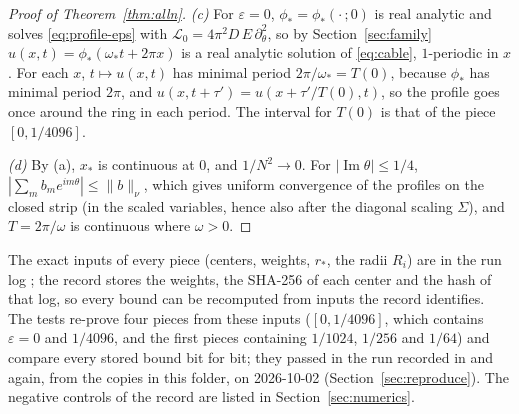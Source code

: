 \documentclass[11pt]{article}
\theoremstyle{definition}
\newcommand{\im}{\operatorname{Im}}
\begin{document}
\begin{proof}[Proof of Theorem~\ref{thm:alln}]
\emph{(c)} For $\varepsilon = 0$, $\phi_* = \phi_*(\cdot\,;0)$ is real analytic and solves \eqref{eq:profile-eps} with $\mathcal L_0 = 4\pi^2D\,E\,\partial_\theta^2$, so by Section~\ref{sec:family} $u(x, t) = \phi_*(\omega_*t + 2\pi x)$ is a real analytic solution of \eqref{eq:cable}, $1$-periodic in $x$. For each $x$, $t \mapsto u(x, t)$ has minimal period $2\pi/\omega_* = T(0)$, because $\phi_*$ has minimal period $2\pi$, and $u(x, t + \tau') = u(x + \tau'/T(0), t)$, so the profile goes once around the ring in each period. The interval for $T(0)$ is that of the piece $[0, 1/4096]$.

\emph{(d)} By (a), $x_*$ is continuous at $0$, and $1/N^2 \to 0$. For $|\im\theta| \le 1/4$, $|\sum_mb_me^{im\theta}| \le \|b\|_\nu$, which gives uniform convergence of the profiles on the closed strip (in the scaled variables, hence also after the diagonal scaling $\Sigma$), and $T = 2\pi/\omega$ is continuous where $\omega > 0$.
\end{proof}

The exact inputs of every piece (centers, weights, $r_*$, the radii $R_i$) are in the run log ; the record stores the weights, the SHA-256 of each center and the hash of that log, so every bound can be recomputed from inputs the record identifies. The tests  re-prove four pieces from these inputs ($[0, 1/4096]$, which contains $\varepsilon = 0$ and $1/4096$, and the first pieces containing $1/1024$, $1/256$ and $1/64$) and compare every stored bound bit for bit; they passed in the run recorded in  and again, from the copies in this folder, on 2026-10-02 (Section~\ref{sec:reproduce}). The negative controls of the record are listed in Section~\ref{sec:numerics}.
\end{document}
